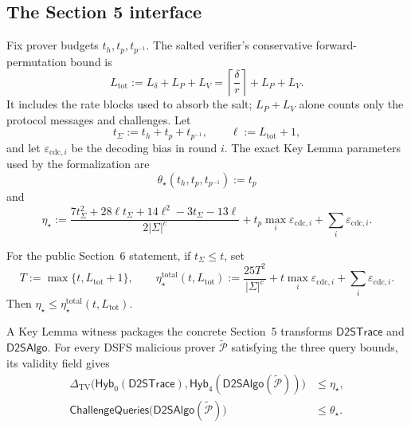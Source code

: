 \subsection{The Section 5 interface}

Fix prover budgets $t_h,t_p,t_{p^{-1}}$.  The salted verifier's conservative
forward-permutation bound is
\[
  L_{\mathrm{tot}}:=L_{\delta}+L_P+L_V
    =\left\lceil\frac{\delta}{r}\right\rceil+L_P+L_V.
\]
It includes the rate blocks used to absorb the salt; $L_P+L_V$ alone counts only the protocol
messages and challenges.  Let
\[
  t_{\Sigma}:=t_h+t_p+t_{p^{-1}},\qquad \ell:=L_{\mathrm{tot}}+1,
\]
and let $\varepsilon_{\mathrm{cdc},i}$ be the decoding bias in round $i$.  The exact Key Lemma
parameters used by the formalization are
\[
  \theta_{\star}(t_h,t_p,t_{p^{-1}}):=t_p
\]
and
\[
  \eta_{\star}:=
    \frac{
      7t_{\Sigma}^{2}+28\ell t_{\Sigma}+14\ell^{2}
        -3t_{\Sigma}-13\ell
    }{2|\Sigma|^{c}}
    +t_p\max_i\varepsilon_{\mathrm{cdc},i}
    +\sum_i\varepsilon_{\mathrm{cdc},i}.
\]

For the public Section~6 statement, if $t_{\Sigma}\leq t$, set
\[
  T:=\max\{t,L_{\mathrm{tot}}+1\},\qquad
  \eta_{\star}^{\mathrm{total}}(t,L_{\mathrm{tot}}):=
    \frac{25T^2}{|\Sigma|^c}
      +t\max_i\varepsilon_{\mathrm{cdc},i}
      +\sum_i\varepsilon_{\mathrm{cdc},i}.
\]
Then $\eta_{\star}\leq\eta_{\star}^{\mathrm{total}}(t,L_{\mathrm{tot}})$.
\leanok

\begin{definition}
  \label{def:dsfs_key_lemma_security_witness}
  A Key Lemma witness packages the concrete Section~5 transforms
  $\mathsf{D2STrace}$ and $\mathsf{D2SAlgo}$.  For every DSFS malicious prover
  $\widetilde{\mathcal P}$ satisfying the three query bounds, its validity field gives
  \begin{align*}
    \Delta_{\mathrm{TV}}\bigl(
      \mathsf{Hyb}_0(\mathsf{D2STrace}),
      \mathsf{Hyb}_4(\mathsf{D2SAlgo}(\widetilde{\mathcal P}))
    \bigr)
      &\leq \eta_{\star},\\
    \mathsf{ChallengeQueries}\bigl(
      \mathsf{D2SAlgo}(\widetilde{\mathcal P})
    \bigr)
      &\leq \theta_{\star}.
  \end{align*}
\end{definition}

